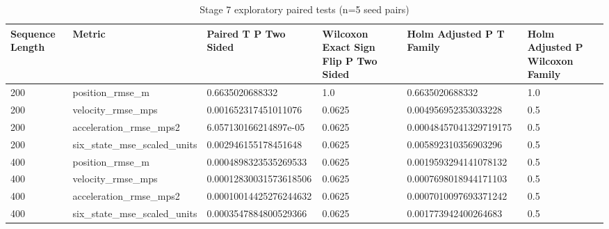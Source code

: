 \begin{table}[t]
\centering
\caption{Stage 7 exploratory paired tests (n=5 seed pairs)}
\label{tab:stage7}
\scriptsize
\begin{tabular}{llllll}
\hline
Sequence Length & Metric & Paired T P Two Sided & Wilcoxon Exact Sign Flip P Two Sided & Holm Adjusted P T Family & Holm Adjusted P Wilcoxon Family \\
\hline
200 & position\_rmse\_m & 0.6635020688332 & 1.0 & 0.6635020688332 & 1.0 \\
200 & velocity\_rmse\_mps & 0.001652317451011076 & 0.0625 & 0.004956952353033228 & 0.5 \\
200 & acceleration\_rmse\_mps2 & 6.057130166214897e-05 & 0.0625 & 0.00048457041329719175 & 0.5 \\
200 & six\_state\_mse\_scaled\_units & 0.002946155178451648 & 0.0625 & 0.005892310356903296 & 0.5 \\
400 & position\_rmse\_m & 0.0004898323535269533 & 0.0625 & 0.0019593294141078132 & 0.5 \\
400 & velocity\_rmse\_mps & 0.00012830031573618506 & 0.0625 & 0.0007698018944171103 & 0.5 \\
400 & acceleration\_rmse\_mps2 & 0.00010014425276244632 & 0.0625 & 0.0007010097693371242 & 0.5 \\
400 & six\_state\_mse\_scaled\_units & 0.0003547884800529366 & 0.0625 & 0.001773942400264683 & 0.5 \\
\hline
\end{tabular}
\end{table}
